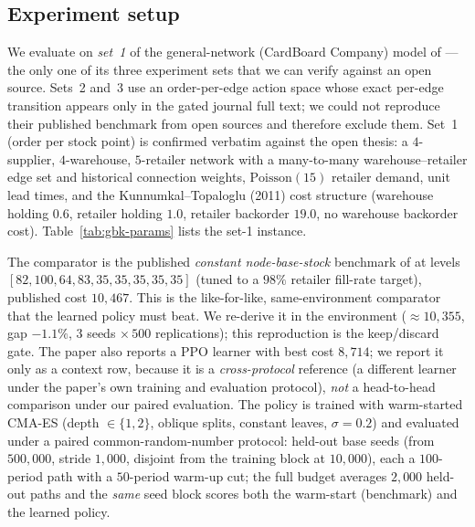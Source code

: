 \subsection{Experiment setup}
\label{sec:gbk-setup}

We evaluate on \emph{set~1} of the general-network (CardBoard Company) model of
\citet{geevers2024cardboard} --- the only one of its three experiment sets that we can verify against
an open source. Sets~2 and~3 use an order-per-edge action space whose exact per-edge transition
appears only in the gated journal full text; we could not reproduce their published benchmark from
open sources and therefore exclude them. Set~1 (order per stock point) is confirmed verbatim against
the open thesis: a $4$-supplier, $4$-warehouse, $5$-retailer network with a many-to-many
warehouse--retailer edge set and historical connection weights, $\mathrm{Poisson}(15)$ retailer
demand, unit lead times, and the Kunnumkal--Topaloglu (2011) cost structure (warehouse holding $0.6$,
retailer holding $1.0$, retailer backorder $19.0$, no warehouse backorder cost).
Table~\ref{tab:gbk-params} lists the set-1 instance.

The comparator is the published \emph{constant node-base-stock} benchmark of
\citet{geevers2024cardboard} at levels $[82,100,64,83,35,35,35,35,35]$ (tuned to a $98\%$ retailer
fill-rate target), published cost $10{,}467$. This is the like-for-like, same-environment comparator
that the learned policy must beat. We re-derive it in the environment ($\approx 10{,}355$, gap
$-1.1\%$, $3$ seeds $\times\,500$ replications); this reproduction is the keep/discard gate. The paper
also reports a PPO learner with best cost $8{,}714$; we report it only as a context row, because it is
a \emph{cross-protocol} reference (a different learner under the paper's own training and evaluation
protocol), \emph{not} a head-to-head comparison under our paired evaluation. The policy is trained with
warm-started CMA-ES (depth $\in\{1,2\}$, oblique splits, constant leaves, $\sigma=0.2$) and evaluated
under a paired common-random-number protocol: held-out base seeds (from $500{,}000$, stride $1{,}000$,
disjoint from the training block at $10{,}000$), each a $100$-period path with a $50$-period warm-up
cut; the full budget averages $2{,}000$ held-out paths and the \emph{same} seed block scores both the
warm-start (benchmark) and the learned policy.

